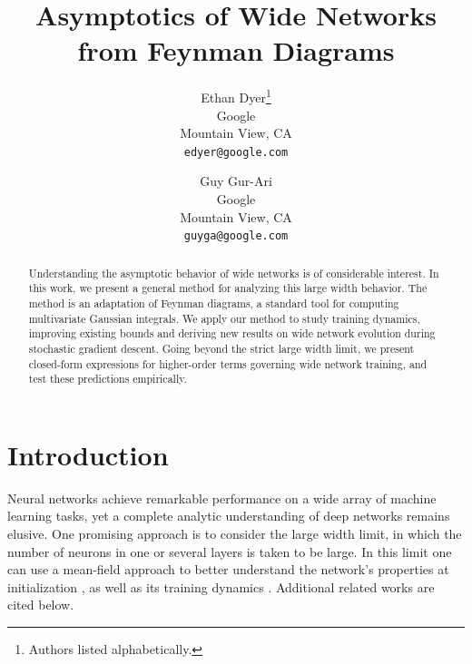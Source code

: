 \documentclass[english]{article}
\newcommand{\pcite}[1]{\cite{#1}}
\begin{document}
\title{Asymptotics of Wide Networks \\ from Feynman Diagrams}

\author{Ethan Dyer\thanks{Authors listed alphabetically.}
  \\ Google \\ Mountain View, CA
  \\ \texttt{edyer@google.com}
  \and
  Guy Gur-Ari\footnotemark[1]
  \\ Google \\ Mountain View, CA
  \\ \texttt{guyga@google.com}
}

\maketitle
\begin{abstract}
 Understanding the asymptotic behavior of wide networks is of considerable interest.
  In this work, we present a general method for analyzing this large width behavior.
  The method is an adaptation of Feynman diagrams, a standard tool for computing multivariate Gaussian integrals.
  We apply our method to study training dynamics, improving existing bounds and deriving new results on wide network evolution during stochastic gradient descent.
  Going beyond the strict large width limit, we present closed-form expressions for higher-order terms governing wide network training, and test these predictions empirically.
\end{abstract}

\tableofcontents{}

\section{Introduction}
Neural networks achieve remarkable performance on a wide array of machine learning tasks,
yet a complete analytic understanding of deep networks remains elusive.
One promising approach is to consider the large width limit, in which the number of neurons in one or several layers is taken to be large.
In this limit one can use a mean-field approach to better understand the network's properties at initialization \pcite{Neal1996, lee2018deep}, as well as its training dynamics \pcite{daniely2017sgd, ntk}. Additional related works are cited below.
\end{document}
